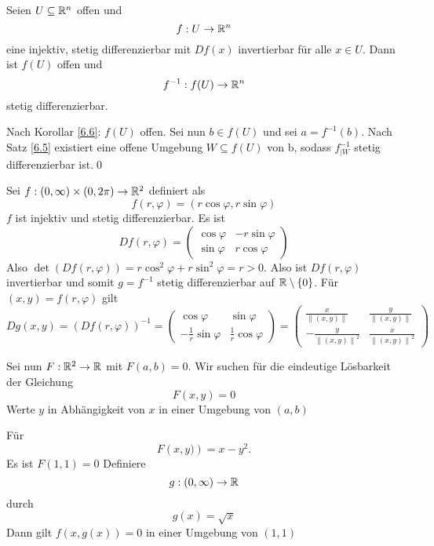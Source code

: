 \begin{corollary}
	Seien $ U \subseteq \mathbb{R} ^n $ offen und
	\[
		f : U \to \mathbb{R} ^n
	\]
	eine injektiv, stetig differenzierbar mit $ Df(x) $ invertierbar für alle $ x \in U $.
	Dann ist $ f(U) $ offen und
	\[
		f^{-1} : f(U) \to \mathbb{R} ^n
	\]
	stetig differenzierbar.
\end{corollary}
\begin{proof*}
	Nach Korollar \ref{6.6}: $ f(U) $ offen.
	Sei nun $ b \in f(U) $ und sei $ a = f^{-1} (b) $.
	Nach Satz \ref{6.5} existiert eine offene Umgebung $ W \subseteq f(U) $ von b, sodass $ f_{|W} ^{-1}  $ stetig differenzierbar ist.\qed
\end{proof*}

\begin{example}
	Sei $ f: \left( 0, \infty \right) \times \left( 0, 2 \pi  \right) \to \mathbb{R} ^2 $ definiert als
	\[
		f(r, \varphi) = \left( r \cos \varphi, r \sin \varphi \right) 
	\]
	$ f $ ist injektiv und stetig differenzierbar.
	Es ist
	\[
		Df\left( r, \varphi \right) =
		\begin{pmatrix} 
			\cos \varphi & - r \sin \varphi \\
			\sin \varphi &   r \cos \varphi
		\end{pmatrix} 
	\]
	Also $ \det \left( Df\left( r, \varphi \right)  \right) = r \cos ^2 \varphi + r \sin ^2 \varphi = r > 0 $.
	Also ist $ Df\left( r, \varphi \right)  $ invertierbar und somit $ g = f^{-1}  $ stetig differenzierbar auf $ \mathbb{R} \setminus \left\{ 0 \right\}  $.
	Für $ (x, y) = f(r, \varphi) $ gilt
	\[
		Dg(x, y) = \left( Df(r, \varphi) \right) ^{-1} =
		\begin{pmatrix} 
			\cos \varphi & \sin \varphi \\
			- \frac{ 1 }{ r } \sin \varphi & \frac{ 1 }{ r } \cos \varphi
		\end{pmatrix} 
		=
		\begin{pmatrix} 
			\frac{ x }{ \left\| (x, y) \right\|  } & \frac{ y }{ \left\| (x, y) \right\|  } \\
			- \frac{ y }{ \left\| (x, y) \right\| ^2 } & \frac{ x }{ \left\| (x, y) \right\| ^2 } 
		\end{pmatrix} 
	\]
\end{example}

Sei nun $ F : \mathbb{R} ^2 \to \mathbb{R}  $ mit $ F\left( a, b \right) = 0 $.
Wir suchen für die eindeutige Lösbarkeit der Gleichung
\[
	F(x, y) = 0
\]
Werte $ y $ in Abhängigkeit von $ x $ in einer Umgebung von $ (a, b) $

\begin{example}
	Für
	\[
		F\left( x, y) \right) = x - y^2.
	\]
	Es ist $ F(1, 1) = 0 $ 
	Definiere
	\[
		g : \left( 0, \infty \right) \to \mathbb{R} 
	\]
	durch
	\[
		g(x) = \sqrt{x} 
	\]
	Dann gilt $ f(x, g(x)) = 0 $ in einer Umgebung von $ (1, 1) $
\end{example}


